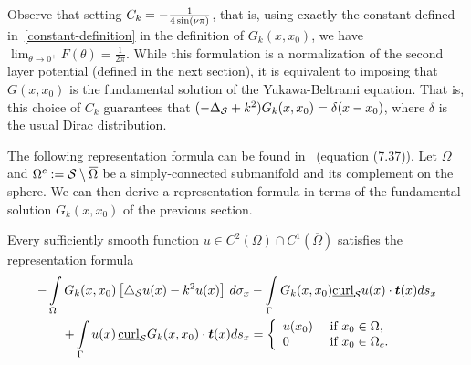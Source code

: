 Observe that setting $\C=-\frac{1}{4\sin(\nu \pi)}$, that is, using
exactly the constant defined in~\eqref{constant-definition} in the
definition of $G_k(x,x_0)$, we have $\lim_{\theta\rightarrow
0^+}F(\theta)=\frac{1}{2\pi}.$  While this formulation is a
normalization of the second layer potential (defined in the next
section), it is equivalent to imposing that $G(x,x_{0})$ is the
fundamental solution of the Yukawa-Beltrami equation.  That is, this
choice of $C_{k}$ guarantees that $(-\Delta_{\S} + k^{2})G_{k}(x,x_{0})
= \delta(x-x_{0})$, where $\delta$ is the usual Dirac distribution.



The following representation formula can be found in~\cite{mit:tay1999}
(equation (7.37)).  Let $\Omega$ and
$\Omega^{c}:=\S\setminus{\overline{\Omega}}$ be a simply-connected
submanifold and its complement on the sphere. We can then derive a
representation formula in terms of the fundamental solution
$G_k(x,x_{0})$ of the previous section.
\begin{proposition}
\label{prop:repr}
Every sufficiently smooth function $u \in C^{2}(\Omega) \cap
C^{1}(\overline{\Omega})$ satisfies the representation formula
\begin{align} 
\label{eq:representationformula}
 - \int\limits_{\Omega} 
    G_k(x,x_{0})\left[\lap_{\S}u(x) -k^2 u(x)\right]\,d\sigma_x 
 &- \int\limits_{{\Gamma}} G_k(x,x_{0})  
    \underline{\mbox{curl}}_{\S} u(x) \cdot \vec{t}(x) ds_x \nonumber \\
 + \int\limits_{{\Gamma}}  u(x)
 \,\underline{\mbox{curl}}_{{\S}} G_k(x,x_0) \cdot \vec{t}(x) ds_x 
 &= \left\{ \begin{array}{ll} u(x_0) & \mbox{ if $x_0\in \Omega$},\\
  0 & \mbox{ if  $x_0\in{\Omega}_c$}. 
  \end{array} \right.
\end{align}
\end{proposition}

